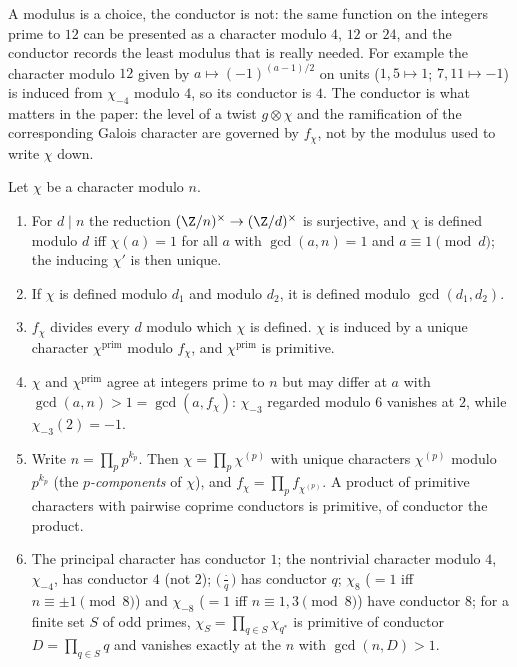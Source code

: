 A modulus is a choice, the conductor is not: the same function on the integers prime to $12$ can be presented as a character modulo $4$,
$12$ or $24$, and the conductor records the least modulus that is really needed. For example the character modulo $12$ given by
$a\mapsto(-1)^{(a-1)/2}$ on units ($1,5\mapsto1$; $7,11\mapsto-1$) is induced from $\chi_{-4}$ modulo $4$, so its conductor is $4$. The conductor is what
matters in the paper: the level of a twist $g\otimes\chi$ and the ramification of the corresponding Galois character are governed by $f_\chi$,
not by the modulus used to write $\chi$ down.

\begin{proposition}\label{prop:rings:conductor}
Let $\chi$ be a character modulo $n$.
\begin{enumerate}[label=(\roman*)]
\item For $d\mid n$ the reduction $(\Z/n)^\times\to(\Z/d)^\times$ is surjective, and $\chi$ is defined modulo $d$ iff $\chi(a)=1$ for all $a$ with $\gcd(a,n)=1$ and
$a\equiv1\pmod d$; the inducing $\chi'$ is then unique.
\item If $\chi$ is defined modulo $d_1$ and modulo $d_2$, it is defined modulo $\gcd(d_1,d_2)$.
\item $f_\chi$ divides every $d$ modulo which $\chi$ is defined. $\chi$ is induced by a unique character $\chi^{\mathrm{prim}}$ modulo $f_\chi$, and $\chi^{\mathrm{prim}}$ is primitive.
\item $\chi$ and $\chi^{\mathrm{prim}}$ agree at integers prime to $n$ but may differ at $a$ with $\gcd(a,n)>1=\gcd(a,f_\chi)$: $\chi_{-3}$ regarded modulo $6$ vanishes at $2$,
while $\chi_{-3}(2)=-1$.
\item Write $n=\prod_pp^{k_p}$. Then $\chi=\prod_p\chi^{(p)}$ with unique characters $\chi^{(p)}$ modulo $p^{k_p}$ (the \emph{$p$-components} of $\chi$), and
$f_\chi=\prod_pf_{\chi^{(p)}}$. A product of primitive
characters with pairwise coprime conductors is primitive, of conductor the product.
\item The principal character has conductor $1$; the nontrivial character modulo $4$, $\chi_{-4}$, has conductor $4$ (not $2$); $\bigl(\frac\cdot q\bigr)$ has conductor
$q$; $\chi_8$ ($=1$ iff $n\equiv\pm1\pmod8$) and $\chi_{-8}$ ($=1$ iff $n\equiv1,3\pmod8$) have conductor $8$; for a finite set $S$ of odd primes,
$\chi_S=\prod_{q\in S}\chi_{q^*}$ is primitive of conductor $D=\prod_{q\in S}q$ and vanishes exactly at the $n$ with $\gcd(n,D)>1$.
\end{enumerate}
\end{proposition}

